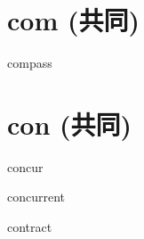 \chapter{com (共同)}

\begin{word}{compass}
\end{word}

\chapter{con (共同)}
\begin{word}{concur}
\end{word}

\begin{word}{concurrent}
\end{word}

\begin{word}{contract}
\end{word}